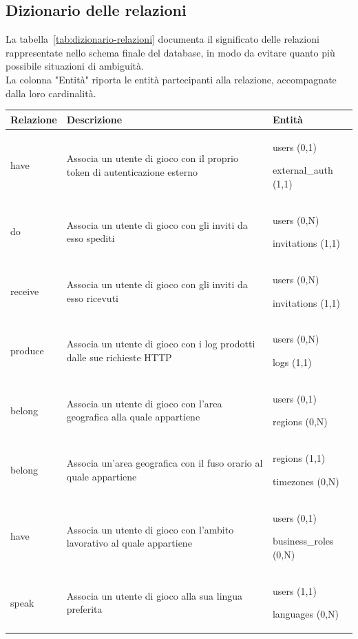 \subsection{Dizionario delle relazioni} %
La tabella~\ref{tab:dizionario-relazioni} documenta il significato delle relazioni rappresentate nello schema finale del database, in modo da evitare quanto più possibile situazioni di ambiguità. \\
La colonna "Entità" riporta le entità partecipanti alla relazione, accompagnate dalla loro cardinalità.

\begin{longtabu} to \textwidth {l X[2] X}
	\toprule
	\textbf{Relazione} & \textbf{Descrizione} & \textbf{Entità}\\
	\midrule
	\endhead
	have       & Associa un utente di gioco con il proprio token di autenticazione esterno            & users (0,1)\par external\_auth (1,1) \\ \midrule
do           & Associa un utente di gioco con gli inviti da esso spediti                            & users (0,N)\par invitations (1,1)   \\ \midrule
receive      & Associa un utente di gioco con gli inviti da esso ricevuti                           & users (0,N)\par invitations (1,1)   \\ \midrule
produce      & Associa un utente di gioco con i log prodotti dalle sue richieste HTTP               & users (0,N)\par logs (1,1)   \\ \midrule
belong      & Associa un utente di gioco con l'area geografica alla quale appartiene                & users (0,1)\par regions (0,N)   \\ \midrule
belong      & Associa un'area geografica con il fuso orario al quale appartiene                     & regions (1,1)\par timezones (0,N)   \\ \midrule
have      & Associa un utente di gioco con l'ambito lavorativo al quale appartiene                  & users (0,1)\par business\_roles (0,N)   \\ \midrule
speak      & Associa un utente di gioco alla sua lingua preferita                                   & users (1,1)\par languages (0,N)   \\ \midrule

\end{longtabu}
